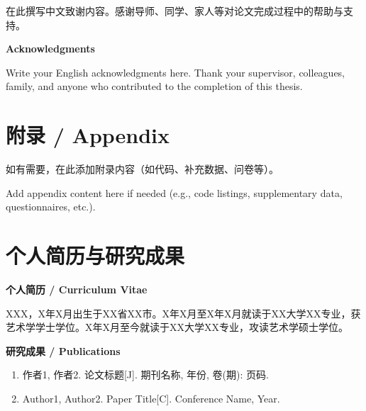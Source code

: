 \documentclass[a4paper,12pt,openright]{ctexrep}
\begin{document}
在此撰写中文致谢内容。感谢导师、同学、家人等对论文完成过程中的帮助与支持。

\vspace{1cm}
\begin{center}
{\large \textbf{Acknowledgments}}
\end{center}
\vspace{0.3cm}

Write your English acknowledgments here. Thank your supervisor, colleagues, family, and anyone who contributed to the completion of this thesis.

\appendix
\chapter{附录 / Appendix}
如有需要，在此添加附录内容（如代码、补充数据、问卷等）。

Add appendix content here if needed (e.g., code listings, supplementary data, questionnaires, etc.).


\chapter*{个人简历与研究成果}

\noindent\textbf{个人简历 / Curriculum Vitae}

\noindent XXX，X年X月出生于XX省XX市。X年X月至X年X月就读于XX大学XX专业，获艺术学学士学位。X年X月至今就读于XX大学XX专业，攻读艺术学硕士学位。

\vspace{0.5cm}
\noindent\textbf{研究成果 / Publications}

\begin{enumerate}
\item 作者1, 作者2. 论文标题[J]. 期刊名称, 年份, 卷(期): 页码.
\item Author1, Author2. Paper Title[C]. Conference Name, Year.
\end{enumerate}
\end{document}
